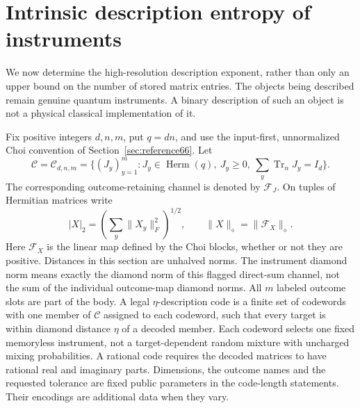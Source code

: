 \section{Intrinsic description entropy of instruments}\label{sec:description67}
We now determine the high-resolution description exponent, rather than
only an upper bound on the number of stored matrix entries. The objects
being described remain genuine quantum instruments. A binary description
of such an object is not a physical classical implementation of it.

Fix positive integers $d,n,m$, put $q=dn$, and use the input-first,
unnormalized Choi convention of Section~\ref{sec:reference66}. Let
\[
 \mathcal C=\mathcal C_{d,n,m}
 =\{(J_y)_{y=1}^m:J_y\in\operatorname{Herm}(q),\ J_y\ge0,
                       \ \sum_y\operatorname{Tr}_n J_y=I_d\}.
\]
The corresponding outcome-retaining channel is denoted by $\mathcal F_J$.
On tuples of Hermitian matrices write
\[
 |X|_2=\left(\sum_y\|X_y\|_F^2\right)^{1/2},\qquad
 \|X\|_{\diamond}=\|\mathcal F_X\|_{\diamond}.
\]
Here $\mathcal F_X$ is the linear map defined by the Choi blocks, whether
or not they are positive. Distances in this section are unhalved norms.
The instrument diamond norm means exactly the diamond norm of this
flagged direct-sum channel, not the sum of the individual outcome-map
diamond norms. All $m$ labeled outcome slots are part of the body.
A legal $\eta$-description code is a finite set of codewords with one
member of $\mathcal C$ assigned to each codeword, such that every target
is within diamond distance $\eta$ of a decoded member. Each codeword
selects one fixed memoryless instrument, not a target-dependent random
mixture with uncharged mixing probabilities. A rational code
requires the decoded matrices to have rational real and imaginary parts.
Dimensions, the outcome names and the requested tolerance are fixed
public parameters in the code-length statements. Their encodings are
additional data when they vary.

